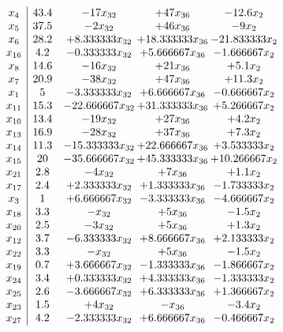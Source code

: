 \documentclass[11pt]{article}
\begin{document}
\[\begin{array}{c| c c@{\hskip 2pt} c@{\hskip 2pt} c@{\hskip 2pt} }
 x_{4}   &  43.4 & -17 x_{32} & + 47 x_{36} & -12.6 x_{2}\\
 x_{5}   &  37.5 & -2 x_{32} & + 46 x_{36} & -9 x_{2}\\
 x_{6}   &  28.2 & + 8.333333 x_{32} & + 18.333333 x_{36} & -21.833333 x_{2}\\
 x_{16}   &  4.2 & -0.333333 x_{32} & + 5.666667 x_{36} & -1.666667 x_{2}\\
 x_{8}   &  14.6 & -16 x_{32} & + 21 x_{36} & + 5.1 x_{2}\\
 x_{7}   &  20.9 & -38 x_{32} & + 47 x_{36} & + 11.3 x_{2}\\
 x_{1}   &  5 & -3.333333 x_{32} & + 6.666667 x_{36} & -0.666667 x_{2}\\
 x_{11}   &  15.3 & -22.666667 x_{32} & + 31.333333 x_{36} & + 5.266667 x_{2}\\
 x_{10}   &  13.4 & -19 x_{32} & + 27 x_{36} & + 4.2 x_{2}\\
 x_{13}   &  16.9 & -28 x_{32} & + 37 x_{36} & + 7.3 x_{2}\\
 x_{14}   &  11.3 & -15.333333 x_{32} & + 22.666667 x_{36} & + 3.533333 x_{2}\\
 x_{15}   &  20 & -35.666667 x_{32} & + 45.333333 x_{36} & + 10.266667 x_{2}\\
 x_{21}   &  2.8 & -4 x_{32} & + 7 x_{36} & + 1.1 x_{2}\\
 x_{17}   &  2.4 & + 2.333333 x_{32} & + 1.333333 x_{36} & -1.733333 x_{2}\\
 x_{3}   &  1 & + 6.666667 x_{32} & -3.333333 x_{36} & -4.666667 x_{2}\\
 x_{18}   &  3.3 & - x_{32} & + 5 x_{36} & -1.5 x_{2}\\
 x_{20}   &  2.5 & -3 x_{32} & + 5 x_{36} & + 1.3 x_{2}\\
 x_{12}   &  3.7 & -6.333333 x_{32} & + 8.666667 x_{36} & + 2.133333 x_{2}\\
 x_{22}   &  3.3 & - x_{32} & + 5 x_{36} & -1.5 x_{2}\\
 x_{19}   &  0.7 & + 3.666667 x_{32} & -1.333333 x_{36} & -1.866667 x_{2}\\
 x_{24}   &  3.4 & + 0.333333 x_{32} & + 4.333333 x_{36} & -1.333333 x_{2}\\
 x_{25}   &  2.6 & -3.666667 x_{32} & + 6.333333 x_{36} & + 1.366667 x_{2}\\
 x_{23}   &  1.5 & + 4 x_{32} & - x_{36} & -3.4 x_{2}\\
 x_{27}   &  4.2 & -2.333333 x_{32} & + 6.666667 x_{36} & -0.466667 x_{2}\\

\end{array}\]
\end{document}
